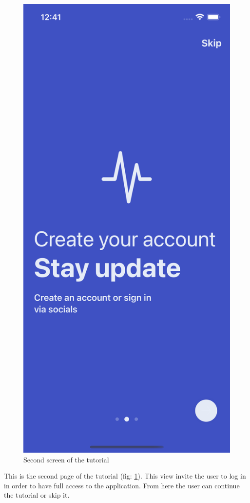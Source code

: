 \begin{figure}[h!]
        \centering
        \includegraphics[scale=0.15]{images/interfaces/tutorial_screen_2.png}
        \caption{Second screen of the tutorial}
        \label{fig:tutorial_screen_2}
\end{figure}
\FloatBarrier
This is the second page of the tutorial (fig: \ref{fig:tutorial_screen_2}). This view invite the user to log in in order to have full access to the application. From here the user can continue the tutorial or skip it.

